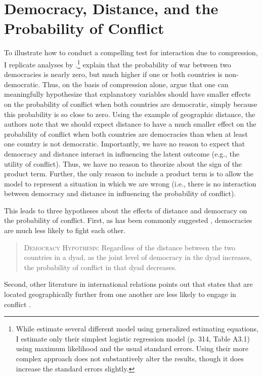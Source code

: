 \documentclass[12pt]{article}
\begin{document}
\section*{Democracy, Distance, and the Probability of Conflict}

To illustrate how to conduct a compelling test for interaction due to compression, I replicate analyses by \cite{OnealRusset2001}.\footnote{While \cite{OnealRusset2001} estimate several different model using generalized estimating equations, I estimate only their simplest logistic regression model (p. 314, Table A3.1) using maximum likelihood and the usual standard errors. Using their more complex approach does not substantively alter the results, though it does increase the standard errors slightly.}  \cite{BerryDeMerittEsarey2010} explain that the probability of war between two democracies is nearly zero, but much higher if one or both countries is non-democratic. Thus, on the basis of compression alone, \cite{BerryDeMerittEsarey2010} argue that one can meaningfully hypothesize that  explanatory variables should have smaller effects on the probability of conflict when both countries are democratic, simply because this probability is so close to zero. Using the example of geographic distance, the authors note that we should expect distance to have a much smaller effect on the probability of conflict when both countries are democracies than when at least one country is not democratic. Importantly, we have no reason to expect that democracy and distance interact in influencing the latent outcome (e.g., the utility of conflict). Thus, we have no reason to theorize about the sign of the product term. Further, the only reason to include a product term is to allow the model to represent a situation in which we are wrong (i.e., there is no interaction between democracy and distance in influencing the probability of conflict). 

This leads to three hypotheses about the effects of distance and democracy on the probability of conflict. First, as has been commonly suggested \citep[e.g.,][]{Ray1998, TomzWeeks2013}, democracies are much less likely to fight each other.

\begin{quote}
\textsc{Democracy Hypothesis}: Regardless of the distance between the two countries in a dyad, as the joint level of democracy in the dyad increases, the probability of conflict in that dyad decreases.
\end{quote}

Second, other literature in international relations points out that states that are located geographically further from one another are less likely to engage in conflict \citep[e.g.,][]{Diehl1991, Bremer1992}. 
\end{document}
